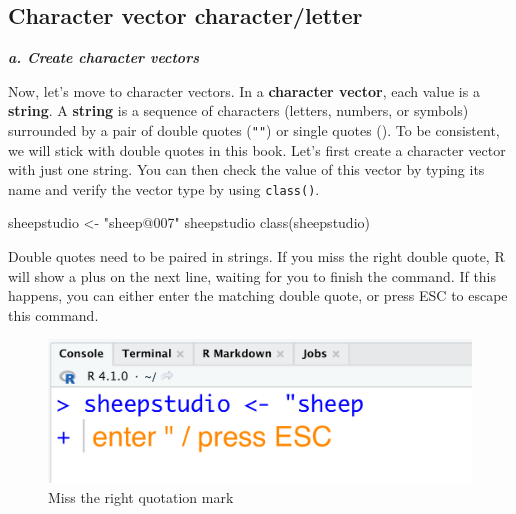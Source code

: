 \documentclass[
]{book}
\newenvironment{Shaded}{\begin{snugshade}}{\end{snugshade}}
\newcommand{\FunctionTok}[1]{\textcolor[rgb]{0.00,0.00,0.00}{#1}}
\newcommand{\NormalTok}[1]{#1}
\newcommand{\OtherTok}[1]{\textcolor[rgb]{0.56,0.35,0.01}{#1}}
\newcommand{\StringTok}[1]{\textcolor[rgb]{0.31,0.60,0.02}{#1}}
\newenvironment{infobox}[1]
  {
  \begin{itemize}
  \renewcommand{\labelitemi}{
    \raisebox{-.7\height}[0pt][0pt]{
      {\setkeys{Gin}{width=3em,keepaspectratio}
        \texttt{[image: pics/\#1]}}
    }
  }
  \setlength{\fboxsep}{1em}
  \begin{blackbox}
  \item
  }
  {
  \end{blackbox}
  \end{itemize}
  }
\newenvironment{blackbox}{
  \definecolor{shadecolor}{rgb}{0, 0, 0}  %
  \color{white}
  \begin{shaded}}
 {\end{shaded}}
\begin{document}
\hypertarget{character-vector-characterletter}{%
\subsection{Character vector character/letter}\label{character-vector-characterletter}}

\textbf{\emph{a. Create character vectors}}

Now, let's move to character vectors. In a \textbf{character vector}, each value is a \textbf{string}. A \textbf{string} is a sequence of characters (letters, numbers, or symbols) surrounded by a pair of double quotes (\texttt{""}) or single quotes (\texttt{\textquotesingle{}\textquotesingle{}}). To be consistent, we will stick with double quotes in this book. Let's first create a character vector with just one string. You can then check the value of this vector by typing its name and verify the vector type by using \texttt{class()}.

\begin{Shaded}
\begin{Highlighting}[]
\NormalTok{sheepstudio }\OtherTok{\textless{}{-}} \StringTok{"sheep@007"} 
\NormalTok{sheepstudio}
\FunctionTok{class}\NormalTok{(sheepstudio)}
\end{Highlighting}
\end{Shaded}

\begin{infobox}{caution}
Double quotes need to be paired in strings. If you miss the right double quote, R will show a plus on the next line, waiting for you to finish the command. If this happens, you can either enter the matching double quote, or press ESC to escape this command.

\end{infobox}

\begin{figure}

{\centering \includegraphics[width=0.7\linewidth]{pics/2quo} 

}

\caption{Miss the right quotation mark}\label{fig:quo}
\end{figure}
\end{document}
